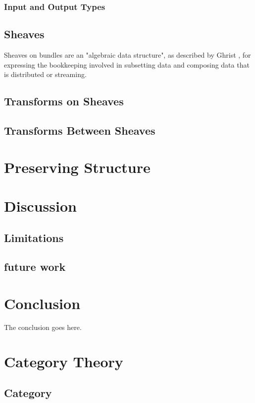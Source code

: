 \documentclass[10pt,journal,compsoc]{IEEEtran}
\theoremstyle{definition}
\theoremstyle{remark}
\begin{document}
\subsubsection{Input and Output Types}

\subsection{Sheaves}
Sheaves on bundles are an "algebraic data structure", as described by Ghrist \cite{ghristElementaryAppliedTopology2014}, for expressing the bookkeeping involved in subsetting data and composing data that is distributed or streaming. 

\subsection{Transforms on Sheaves}

\subsection{Transforms Between Sheaves}

\section{Preserving Structure}





\section{Discussion}
\subsection{Limitations}
\subsection{future work}

\section{Conclusion}
The conclusion goes here.


\appendices
\section{Category Theory}
\subsection*{Category}
\end{document}
